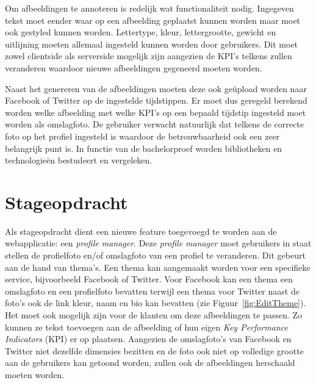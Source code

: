 Om afbeeldingen te annoteren is redelijk wat functionaliteit nodig. Ingegeven tekst moet eender waar op een afbeelding geplaatst kunnen worden maar moet ook gestyled kunnen worden. Lettertype, kleur, lettergrootte, gewicht en uitlijning moeten allemaal ingesteld kunnen worden door gebruikers. Dit moet zowel clientside als serverside mogelijk zijn aangezien de KPI's telkens zullen veranderen waardoor nieuwe afbeeldingen gegeneerd moeten worden. 

Naast het genereren van de afbeeldingen moeten deze ook ge\"{u}pload worden naar Facebook of Twitter op de ingestelde tijdstippen. Er moet dus geregeld berekend worden welke afbeelding met welke KPI's op een bepaald tijdstip ingesteld moet worden als omslagfoto. De gebruiker verwacht natuurlijk dat telkens de correcte foto op het profiel ingesteld is waardoor de betrouwbaarheid ook een zeer belangrijk punt is. In functie van de bachelorproef worden bibliotheken en technologie\"{e}n bestudeert en vergeleken.  





\iffalse
\chapter{Stageopdracht}
\vspace{-3cm}
Als stageopdracht dient een nieuwe feature toegevoegd te worden aan de webapplicatie: een \textit{profile manager}. Deze \textit{profile manager} moet gebruikers in staat stellen de profielfoto en/of omslagfoto van een profiel te veranderen. Dit gebeurt aan de hand van thema's. Een thema kan aangemaakt worden voor een specifieke service, bijvoorbeeld Facebook of Twitter. Voor Facebook kan een thema een omslagfoto en een profielfoto bevatten terwijl een thema voor Twitter naast de foto's ook de link kleur, naam en bio kan bevatten (zie Figuur~\ref{fig:EditTheme}). Het moet ook mogelijk zijn voor de klanten om deze afbeeldingen te passen. Zo kunnen ze tekst toevoegen aan de afbeelding of hun eigen \textit{Key Performance Indicators} (KPI) er op plaatsen. Aangezien de omslagfoto's van Facebook en Twitter niet dezelfde dimensies bezitten en de foto ook niet op volledige grootte aan de gebruikers kan getoond worden, zullen ook de afbeeldingen herschaald moeten worden.

